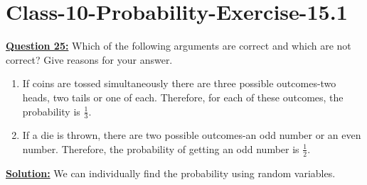 \documentclass[journal,12pt,twocolumn]{IEEEtran}
\begin{document}
	\section{Class-10-Probability-Exercise-15.1}
\textbf{\underline{Question 25:}} Which of the following arguments are correct and which are not correct? Give reasons for your answer.
    \begin{enumerate}[label=(\roman*)]
    \item If coins are tossed simultaneously there are three possible outcomes-two heads, two tails or one of each. Therefore, for each of these outcomes, the probability is $\frac{1}{3}$.
    \item If a die is thrown, there are two possible outcomes-an odd number or an even number. Therefore, the probability of getting an odd number is $\frac{1}{2}$.
	\end{enumerate}
	\textbf{\underline{Solution:}} We can individually find the probability using random variables.
\end{document}
